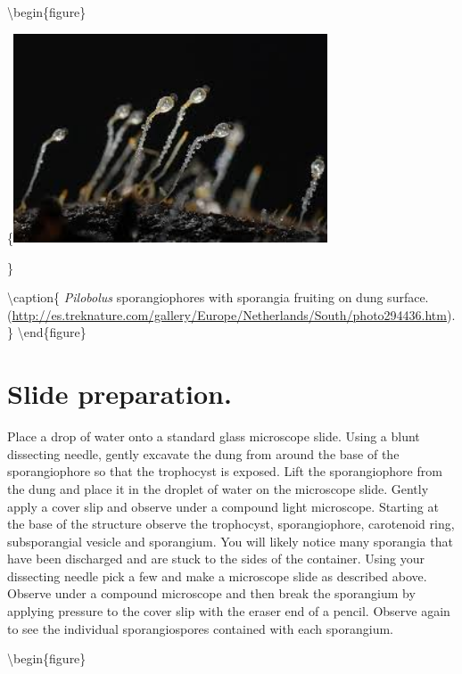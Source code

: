 \documentclass[]{book}
\begin{document}
\textbackslash begin\{figure\}

\{\centering \includegraphics[width=3.67in]{img/Ch9_Fig3}

\}

\textbackslash caption\{ \emph{Pilobolus} sporangiophores with sporangia fruiting on dung surface. (\url{http://es.treknature.com/gallery/Europe/Netherlands/South/photo294436.htm}).\}\label{fig:ch9fig3}
\textbackslash end\{figure\}

\hypertarget{slide-preparation.}{%
\section{Slide preparation.}\label{slide-preparation.}}

Place a drop of water onto a standard glass microscope slide. Using a blunt dissecting needle, gently excavate the dung from around the base of the sporangiophore so that the trophocyst is exposed. Lift the sporangiophore from the dung and place it in the droplet of water on the microscope slide. Gently apply a cover slip and observe under a compound light microscope. Starting at the base of the structure observe the trophocyst, sporangiophore, carotenoid ring, subsporangial vesicle and sporangium. You will likely notice many sporangia that have been discharged and are stuck to the sides of the container. Using your dissecting needle pick a few and make a microscope slide as described above. Observe under a compound microscope and then break the sporangium by applying pressure to the cover slip with the eraser end of a pencil. Observe again to see the individual sporangiospores contained with each sporangium.

\textbackslash begin\{figure\}
\end{document}
